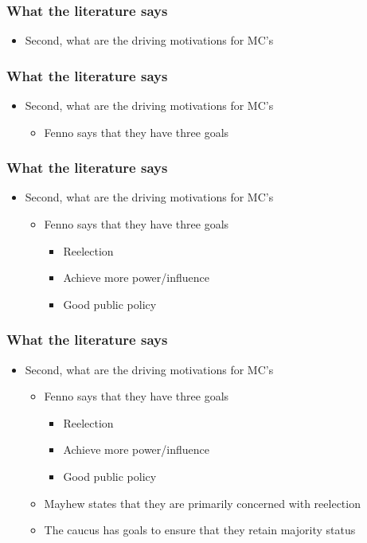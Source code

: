 \documentclass[notheorems, aspectratio=54]{beamer}
\begin{document}
\begin{frame}\frametitle{What the literature says}
	\begin{itemize}\setlength\itemsep{1em}
		\item Second, what are the driving motivations for MC's
	\end{itemize}
\end{frame}

\begin{frame}\frametitle{What the literature says}
	\begin{itemize}\setlength\itemsep{1em}
		\item Second, what are the driving motivations for MC's
		\begin{itemize}
			\item Fenno says that they have three goals
		\end{itemize}
	\end{itemize}
\end{frame}

\begin{frame}\frametitle{What the literature says}
	\begin{itemize}\setlength\itemsep{1em}
		\item Second, what are the driving motivations for MC's
		\begin{itemize}
			\item Fenno says that they have three goals
			\begin{itemize}
				\item Reelection
				\item Achieve more power/influence
				\item Good public policy
			\end{itemize}
		\end{itemize}
	\end{itemize}
\end{frame}

\begin{frame}\frametitle{What the literature says}
	\begin{itemize}\setlength\itemsep{1em}
		\item Second, what are the driving motivations for MC's
		\begin{itemize}
			\item Fenno says that they have three goals
			\begin{itemize}
				\item Reelection
				\item Achieve more power/influence
				\item Good public policy
			\end{itemize}
			\item Mayhew states that they are primarily concerned with reelection
			\item The caucus has goals to ensure that they retain majority status
		\end{itemize}
	\end{itemize}
\end{frame}
\end{document}
